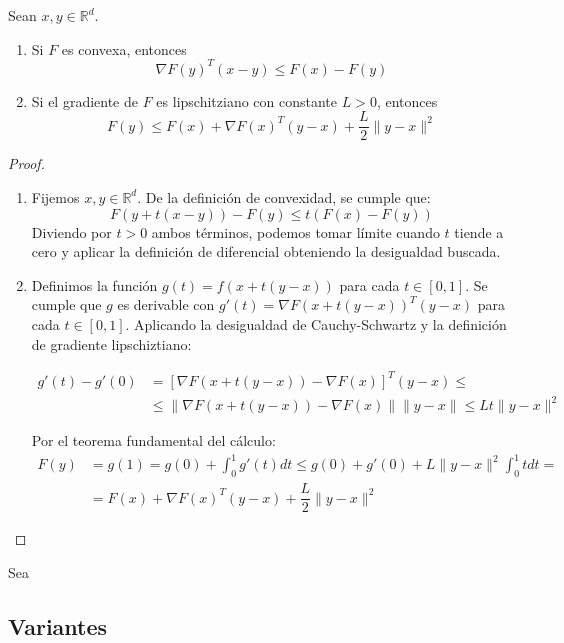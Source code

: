 \begin{lemma}
	\leavevmode
	Sean $x, y \in \mathbb{R}^d$.
	\begin{enumerate}
		\item Si $F$ es convexa, entonces $$\nabla F(y)^T (x-y) \leq F(x) - F(y)$$
		\item Si el gradiente de $F$ es lipschitziano con constante $L>0$, entonces $$F(y) \leq F(x) + \nabla F(x)^T(y-x) + \dfrac{L}{2} \| y-x\|^2$$
	\end{enumerate}
\end{lemma}
\begin{proof}
	\leavevmode
	\begin{enumerate}
		\item Fijemos $x, y \in \mathbb{R}^d$. De la definición de convexidad, se cumple que:
		$$F(y + t(x-y)) - F(y) \leq t (F(x) - F(y)) $$
		Diviendo por $t>0$ ambos términos, podemos tomar límite cuando $t$ tiende a cero y aplicar la definición de diferencial obteniendo la desigualdad buscada.
		\item Definimos la función $g(t) = f(x + t(y-x))$ para cada $t \in [0,1]$. Se cumple que $g$ es derivable con $g'(t) = \nabla F(x + t(y-x))^T(y-x)$ para cada $t \in [0,1]$. Aplicando la desigualdad de Cauchy-Schwartz y la definición de gradiente lipschiztiano:
		
		\begin{align*}
			g'(t) - g'(0) & = \left[ \nabla F(x + t(y-x)) - \nabla F(x) \right]^T (y-x) \leq \\
			&\leq  \| \nabla F(x + t(y-x)) - \nabla F(x) \| \| y-x \| \leq L t \| y-x \|^2
	 	\end{align*}
 		
 		Por el teorema fundamental del cálculo:
 		\begin{align*}
 			F(y) & = g(1) = g(0) + \int_{0}^{1}g'(t)dt \leq g(0) + g'(0) + L \| y-x \|^2 \int_{0}^{1}t dt= \\
 			& = F(x) + \nabla F(x)^T(y-x) + \dfrac{L}{2} \| y-x\|^2
 		\end{align*}
	\end{enumerate}
\end{proof}

\begin{proposition}
	Sea 
\end{proposition}




\subsection{Variantes}